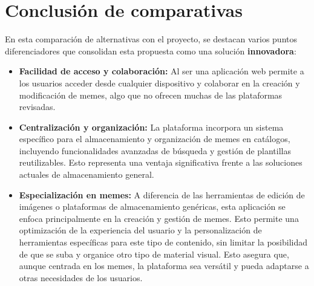 \section{Conclusión de comparativas}

En esta comparación de alternativas con el proyecto, se destacan varios puntos diferenciadores que consolidan esta propuesta como una solución \textbf{innovadora}:

\begin{itemize}
  \item \textbf{Facilidad de acceso y colaboración:} Al ser una aplicación web permite a los usuarios acceder desde cualquier dispositivo y colaborar en la creación y modificación de memes, algo que no ofrecen muchas de las plataformas revisadas.
  \item \textbf{Centralización y organización:} La plataforma incorpora un sistema específico para el almacenamiento y organización de memes en catálogos, incluyendo funcionalidades avanzadas de búsqueda y gestión de plantillas reutilizables. Esto representa una ventaja significativa frente a las soluciones actuales de almacenamiento general.
  \item \textbf{Especialización en memes:} A diferencia de las herramientas de edición de imágenes o plataformas de almacenamiento genéricas, esta aplicación se enfoca principalmente en la creación y gestión de memes. Esto permite una optimización de la experiencia del usuario y la personalización de herramientas específicas para este tipo de contenido, sin limitar la posibilidad de que se suba y organice otro tipo de material visual. Esto asegura que, aunque centrada en los memes, la plataforma sea versátil y pueda adaptarse a otras necesidades de los usuarios.
\end{itemize}